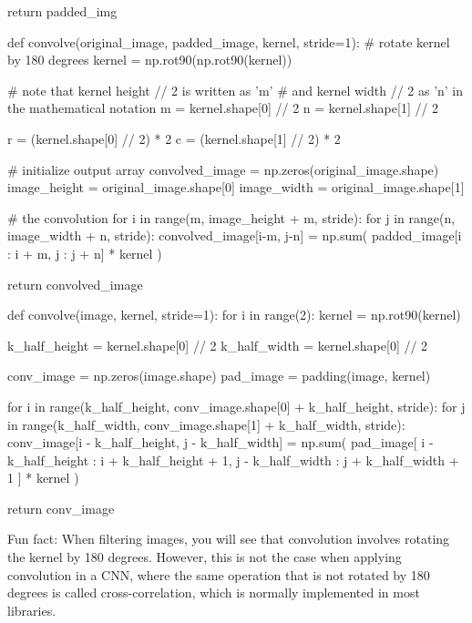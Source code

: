 \documentclass[%
oneside,                 %
final,                   %
10pt]{article}
\begin{document}
    return padded_img

def convolve(original_image, padded_image, kernel, stride=1):
    # rotate kernel by 180 degrees
    kernel = np.rot90(np.rot90(kernel))

    # note that kernel height // 2 is written as 'm'
    # and kernel width // 2 as 'n' in the mathematical notation
    m = kernel.shape[0] // 2
    n = kernel.shape[1] // 2
    
    r = (kernel.shape[0] // 2) * 2
    c = (kernel.shape[1] // 2) * 2
    
    # initialize output array
    convolved_image = np.zeros(original_image.shape)
    image_height = original_image.shape[0]
    image_width = original_image.shape[1]

    # the convolution
    for i in range(m, image_height + m, stride):
        for j in range(n, image_width + n, stride):
            convolved_image[i-m, j-n] = np.sum(
                padded_image[i : i + m, j : j + n]
                * kernel
            )
            
    return convolved_image

def convolve(image, kernel, stride=1):
    for i in range(2):
        kernel = np.rot90(kernel)

    k_half_height = kernel.shape[0] // 2
    k_half_width = kernel.shape[0] // 2

    conv_image = np.zeros(image.shape)
    pad_image = padding(image, kernel)

    for i in range(k_half_height, conv_image.shape[0] + k_half_height, stride):
        for j in range(k_half_width, conv_image.shape[1] + k_half_width, stride):
            conv_image[i - k_half_height, j - k_half_width] = np.sum(
                pad_image[
                    i - k_half_height : i + k_half_height + 1, j - k_half_width : j + k_half_width + 1
                ]
                * kernel
            )

    return conv_image

\epycod


Fun fact: When filtering images, you will see that convolution
involves rotating the kernel by 180 degrees.  However, this is not the
case when applying convolution in a CNN, where the same operation that is not
rotated by 180 degrees is called cross-correlation, which is normally implemented in most libraries.
\end{document}
